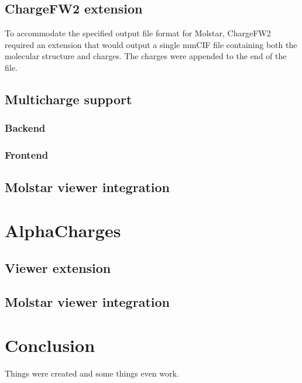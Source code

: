 \documentclass[
  digital,     %
  oneside,     %
  nosansbold,  %
  nocolorbold, %
  lof,         %
  lot,         %
]{fithesis4}
\begin{document}
\section{ChargeFW2 extension}

To accommodate the specified output file format for Molstar, ChargeFW2 required an extension that would output a single mmCIF file containing both the molecular structure and charges. The charges were appended to the end of the file.

\section{Multicharge support}

\subsection{Backend}

\subsection{Frontend}

\section{Molstar viewer integration}

\chapter{AlphaCharges}
\section{Viewer extension}
\section{Molstar viewer integration}


\chapter*{Conclusion}

Things were created and some things even work.
\end{document}

